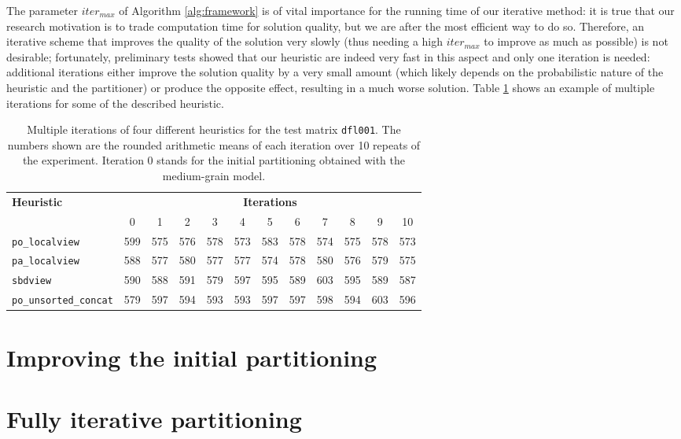 The parameter $iter_{max}$ of Algorithm \ref{alg:framework} is of vital importance for the running time of our iterative method: it is true that our research motivation is to trade computation time for solution quality, but we are after the most efficient way to do so. Therefore, an iterative scheme that improves the quality of the solution very slowly (thus needing a high $iter_{max}$ to improve as much as possible) is not desirable; fortunately, preliminary tests showed that our heuristic are indeed very fast in this aspect and only one iteration is needed: additional iterations either improve the solution quality by a very small amount (which likely depends on the probabilistic nature of the heuristic and the partitioner) or produce the opposite effect, resulting in a much worse solution. Table \ref{tab:iterations} shows an example of multiple iterations for some of the described heuristic.

\begin{table}[h]
	\centering
	\begin{tabular}{|l|c||c|c|c|c|c|c|c|c|c|c|}
		\hline
		\multirow{2}{*}{\textbf{Heuristic}} & \multicolumn{11}{c|}{\textbf{Iterations}} \\ \cline{2-12} 
		& 0 & 1 & 2 & 3 & 4 & 5 & 6 & 7 & 8 & 9 & 10 \\ \hline
		\verb|po_localview| & 599 & 575 & 576 & 578 & 573 & 583 & 578 & 574 & 575 & 578 & 573 \\
		\verb|pa_localview| & 588 & 577 & 580 & 577 & 577 & 574 & 578 & 580 & 576 & 579 & 575  \\
 \verb|sbdview| & 590 & 588 & 591 & 579 & 597 & 595 & 589 & 603 & 595 & 589 & 587 \\
 \verb|po_unsorted_concat| & 579 & 597 & 594 & 593 & 593 & 597 & 597 & 598 & 594 & 603 & 596 \\ 
		\hline
	\end{tabular}
	\caption{Multiple iterations of four different heuristics for the test matrix \texttt{dfl001}. The numbers shown are the rounded arithmetic means of each iteration over 10 repeats of the experiment. Iteration 0 stands for the initial partitioning obtained with the medium-grain model. } \label{tab:iterations}
\end{table}



\section{Improving the initial partitioning}
\section{Fully iterative partitioning}



